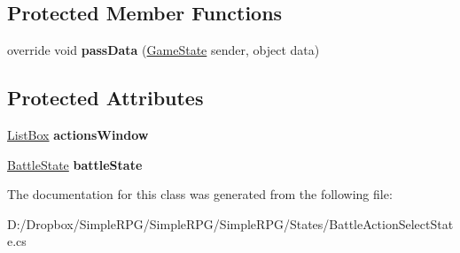 \subsection*{Protected Member Functions}
\begin{DoxyCompactItemize}
\item 
\hypertarget{class_simple_r_p_g_1_1_states_1_1_battle_action_select_state_ad1eaf46bf46fedfd8d465e9ad29b0018}{override void {\bfseries pass\+Data} (\hyperlink{class_simple_r_p_g_1_1_states_1_1_game_state}{Game\+State} sender, object data)}\label{class_simple_r_p_g_1_1_states_1_1_battle_action_select_state_ad1eaf46bf46fedfd8d465e9ad29b0018}

\end{DoxyCompactItemize}
\subsection*{Protected Attributes}
\begin{DoxyCompactItemize}
\item 
\hypertarget{class_simple_r_p_g_1_1_states_1_1_battle_action_select_state_a39f78e7281767700dfcd8725e0e0febe}{\hyperlink{class_simple_r_p_g_1_1_windows_1_1_list_box}{List\+Box} {\bfseries actions\+Window}}\label{class_simple_r_p_g_1_1_states_1_1_battle_action_select_state_a39f78e7281767700dfcd8725e0e0febe}

\item 
\hypertarget{class_simple_r_p_g_1_1_states_1_1_battle_action_select_state_ae1643c22fb4bbd4d594079fe83dabc60}{\hyperlink{class_simple_r_p_g_1_1_states_1_1_battle_state}{Battle\+State} {\bfseries battle\+State}}\label{class_simple_r_p_g_1_1_states_1_1_battle_action_select_state_ae1643c22fb4bbd4d594079fe83dabc60}

\end{DoxyCompactItemize}


The documentation for this class was generated from the following file\+:\begin{DoxyCompactItemize}
\item 
D\+:/\+Dropbox/\+Simple\+R\+P\+G/\+Simple\+R\+P\+G/\+Simple\+R\+P\+G/\+States/Battle\+Action\+Select\+State.\+cs\end{DoxyCompactItemize}
